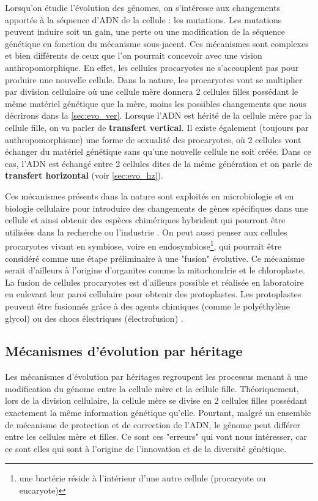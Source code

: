 Lorsqu'on étudie l'évolution des génomes, on s'intéresse aux changements apportés à la séquence d'ADN de la cellule : les mutations. Les mutations peuvent induire soit un gain, une perte ou une modification de la séquence génétique en fonction du mécanisme sous-jacent. Ces mécanismes sont complexes et bien différents de ceux que l'on pourrait concevoir avec une vision anthropomorphique. En effet, les cellules procaryotes ne s'accouplent pas pour produire une nouvelle cellule. Dans la nature, les procaryotes vont se multiplier par division cellulaire où une cellule mère donnera 2 cellules filles possédant le même matériel génétique que la mère, moins les possibles changements que nous décrirons dans la \autoref{sec:evo_ver}. Lorsque l'ADN est hérité de la cellule mère par la cellule fille, on va parler de \textbf{transfert vertical}. Il existe également (toujours par anthropomorphisme) une forme de sexualité des procaryotes, où 2 cellules vont échanger du matériel génétique sans qu'une nouvelle cellule ne soit créée. Dans ce cas, l'ADN est échangé entre 2 cellules dites de la même génération et on parle de \textbf{transfert horizontal} (voir \autoref{sec:evo_hz}). 

Ces mécanismes présents dans la nature sont exploités en microbiologie et en biologie cellulaire pour introduire des changements de gènes spécifiques dans une cellule et ainsi obtenir des espèces chimériques hybrident qui pourront être utilisées dans la recherche ou l'industrie \cite{baby_chromosomes_2019}. On peut aussi penser aux cellules procaryotes vivant en symbiose, voire en endosymbiose\footnote{une bactérie réside à l'intérieur d'une autre cellule (procaryote ou eucaryote)}, qui pourrait être considéré comme une étape préliminaire à une "fusion" évolutive. Ce mécanisme serait d'ailleurs à l'origine d'organites comme la mitochondrie et le chloroplaste\cite{martin_endosymbiotic_2015}. La fusion de cellules procaryotes est d'ailleurs possible et réalisée en laboratoire en enlevant leur paroi cellulaire pour obtenir des protoplastes. Les protoplastes peuvent être fusionnés grâce à des agents chimiques (comme le polyéthylène glycol) ou des chocs électriques (électrofusion) \cite{schaeffer_fusion_1976}.

\subsection{Mécanismes d'évolution par héritage}
\label{sec:evo_ver}
Les mécanismes d'évolution par héritages regroupent les processus menant à une modification du génome entre la cellule mère et la cellule fille. Théoriquement, lors de la division cellulaire, la cellule mère se divise en 2 cellules filles possédant exactement la même information génétique qu'elle. Pourtant, malgré un ensemble de mécanisme de protection et de correction de l'ADN, le génome peut différer entre les cellules mère et filles. Ce sont ces "erreurs" qui vont nous intéresser, car ce sont elles qui sont à l'origine de l'innovation et de la diversité génétique.

